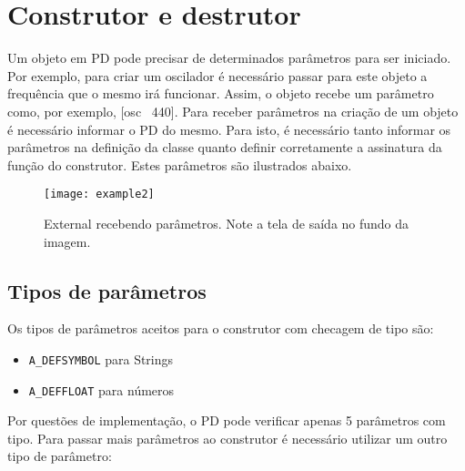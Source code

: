 \chapter{Construtor e destrutor}


Um objeto em PD pode precisar de determinados parâmetros para ser iniciado.
Por exemplo, para criar um oscilador é necessário passar para este objeto a
frequência que o mesmo irá funcionar.
Assim, o objeto recebe um parâmetro como, por exemplo, [osc~ 440].
Para receber parâmetros na criação de um objeto é necessário informar o PD do mesmo.
Para isto, é necessário tanto informar os parâmetros na definição da classe quanto
definir corretamente a assinatura da função do construtor.
Estes parâmetros são ilustrados abaixo.

\begin{figure}[h!]
	\centering
	\texttt{[image: example2]}
	\caption{External recebendo parâmetros. Note a tela de saída no fundo da imagem.}
\end{figure}


\section{Tipos de parâmetros}

Os tipos de parâmetros aceitos para o construtor com checagem de tipo são:
\begin{itemize}
   \item \texttt{A\_DEFSYMBOL} para Strings
   \item \texttt{A\_DEFFLOAT} para números
\end{itemize}

Por questões de implementação, o PD pode verificar apenas 5 parâmetros com tipo.
Para passar mais parâmetros ao construtor é necessário utilizar um outro tipo
de parâmetro:

